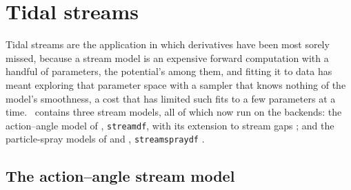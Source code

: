 \section{Tidal streams}\label{sec:streams}

Tidal streams are the application in which derivatives have been most
sorely missed, because a stream model is an expensive forward
computation with a handful of parameters, the potential's among them,
and fitting it to data has meant exploring that parameter space with a
sampler that knows nothing of the model's smoothness, a cost that has
limited such fits to a few parameters at a time. \galpy\ contains three stream models, all of
which now run on the backends: the action--angle model of
\citet{Bovy2014}, \texttt{streamdf}, with its extension to stream gaps
\citep{Sanders2016}; and the particle-spray models of \citet{Fardal2015}
and \citet{Chen2025}, \texttt{streamspraydf} \citep[see also][for the \galpy\ implementation]{Qian2022}.

\subsection{The action--angle stream model}\label{sec:streams-streamdf}

